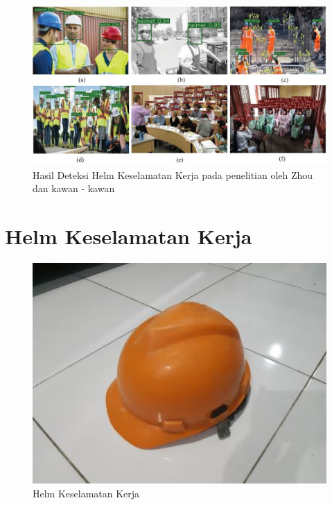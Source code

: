 \begin{figure}[ht]
    \centering
    \includegraphics[scale=0.7]{gambar/zhou_le.jpg}
    \caption{Hasil Deteksi Helm Keselamatan Kerja pada penelitian oleh Zhou dan kawan - kawan}
    \label{fig:zhouimage}  
\end{figure}







\section{Helm Keselamatan Kerja}
\label{sec:helmkeselamatankerja}

\begin{figure}[ht]
    \centering
    \includegraphics[width=1.0\textwidth]{gambar/safety_helmet.jpg}
    \caption{Helm Keselamatan Kerja}
    \label{fig:helmkeselamatankerja}  
\end{figure}

